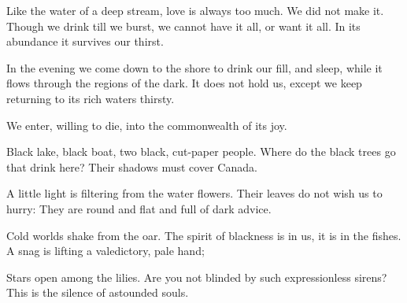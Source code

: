\documentclass[12pt, letterpaper]{report}
\begin{document}
\author{Wendell Berry}

\begin{poem}
\begin{stanza}
Like the water\verseline
of a deep stream,\verseline
love is always too much.\verseline
We did not make it.\verseline
Though we drink till we burst,\verseline
we cannot have it all,\verseline
or want it all.\verseline
In its abundance\verseline
it survives our thirst.
\end{stanza}
\begin{stanza}
In the evening we come down to the shore\verseline
to drink our fill,\verseline
and sleep,\verseline
while it flows\verseline
through the regions of the dark.\verseline
It does not hold us,\verseline
except we keep returning to its rich waters\verseline
thirsty.
\end{stanza}
\begin{stanza}
We enter,\verseline
willing to die,\verseline
into the commonwealth of its joy.
\end{stanza}
\end{poem}

\author{Sylvia Plath}

\begin{poem}
\begin{stanza}
Black lake, black boat, two black, cut-paper people.\verseline
Where do the black trees go that drink here?\verseline
Their shadows must cover Canada.
\end{stanza}
\begin{stanza}
A little light is filtering from the water flowers.\verseline
Their leaves do not wish us to hurry:\verseline
They are round and flat and full of dark advice.
\end{stanza}
\begin{stanza}
Cold worlds shake from the oar.\verseline
The spirit of blackness is in us, it is in the fishes.\verseline
A snag is lifting a valedictory, pale hand;
\end{stanza}
\begin{stanza}
Stars open among the lilies.\verseline
Are you not blinded by such expressionless sirens?\verseline
This is the silence of astounded souls.
\end{stanza}
\end{poem}












  
  
\end{document}
